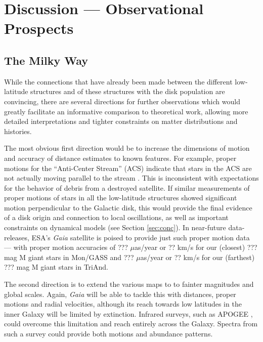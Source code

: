 \documentclass[galaxies,article,submit,moreauthors,pdftex,10pt,a4paper]{mdpi}
\begin{document}
\section{Discussion --- Observational Prospects}

\subsection{The Milky Way}

While the connections that have already been made between the different low-latitude structures and of these structures with the disk population are convincing, there are several directions for further observations which would greatly facilitate an informative comparison to theoretical work, allowing more detailed interpretations and tighter constraints on matter distributions and histories.

The most obvious first direction would be to increase the dimensions of motion and accuracy of distance estimates to known features.
For example,  proper motions for the ``Anti-Center Stream'' (ACS) \cite[which may or may not be part of the larger Mon/GASS structure, see ] []{li12} indicate that stars in the ACS are not actually moving parallel to the stream \cite{carlin10}. This is inconsistent with expectations for the behavior of debris from a destroyed satellite.
If similar measurements of proper motions of stars in all the low-latitude structures showed significant motion perpendicular to the Galactic disk, this would provide the final evidence of a disk origin and connection to local oscillations, as well as important constraints on dynamical models (see Section \ref{sec:conc}).
In near-future data-releases, ESA's {\it Gaia} satellite \cite{???} is poised to provide just such proper motion data --- with proper motion accuracies of ??? $\mu$as/year or ?? km/s for our (closest) ??? mag M giant stars in Mon/GASS and ??? $\mu$as/year or ?? km/s for our (farthest) ??? mag M giant stars in TriAnd.

The second direction is to extend the various maps to to fainter magnitudes and global scales. Again, {\it Gaia} will be able to tackle this with distances, proper motions and radial velocities, although its reach towards low latitudes in the inner Galaxy will be limited by extinction.
Infrared surveys, such as APOGEE \cite{apogee}, could overcome this limitation and reach entirely across the Galaxy. Spectra from such a survey could provide both motions and abundance patterns.
\end{document}
